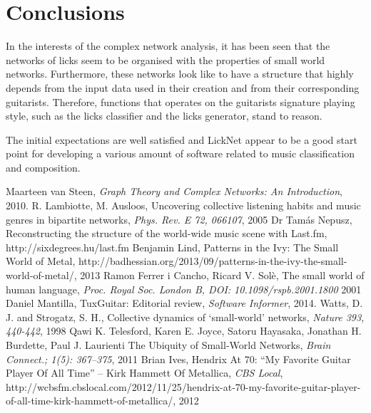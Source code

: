 \documentclass{llncs}
\begin{document}
\section{Conclusions}
In the interests of the complex network analysis, it has been seen that
the networks of licks seem to be organised with the properties of small
world networks. Furthermore, these networks look like to have a
structure that highly depends from the input data used in their
creation and from their corresponding guitarists. Therefore, functions
that operates on the guitarists signature playing style, such as the
licks classifier and the licks generator, stand to reason.

The initial expectations are well satisfied and LickNet appear to be a
good start point for developing a various amount of software related to
music classification and composition.

\begin{thebibliography}{50}
		Maarteen van Steen, 
		\textsl{Graph Theory and Complex Networks: An Introduction}, 
		2010.
		R. Lambiotte, M. Ausloos,
		Uncovering collective listening habits and music genres in bipartite networks,
		\textsl{Phys. Rev. E 72, 066107},
		2005
		Dr Tamás Nepusz,
		Reconstructing the structure of the world-wide music scene with Last.fm,
		http://sixdegrees.hu/last.fm
		Benjamin Lind,
		Patterns in the Ivy: The Small World of Metal,
		http://badhessian.org/2013/09/patterns-in-the-ivy-the-small-world-of-metal/,
		2013
		Ramon Ferrer i Cancho, Ricard V. Solè,
		The small world of human language,
		\textsl{Proc. Royal Soc. London B, DOI: 10.1098/rspb.2001.1800}
		2001
		Daniel Mantilla,
		TuxGuitar: Editorial review,
		\textsl{Software Informer},
		2014.
		Watts, D. J. and Strogatz, S. H.,
		Collective dynamics of `small-world’ networks,
		\textsl{Nature 393, 440-442},
		1998
		Qawi K. Telesford, Karen E. Joyce, Satoru Hayasaka, Jonathan H. Burdette, Paul J. Laurienti
		The Ubiquity of Small-World Networks,
		\textsl{Brain Connect.; 1(5): 367–375},
		2011
		Brian Ives,
		Hendrix At 70: “My Favorite Guitar Player Of All Time” – Kirk Hammett Of Metallica,
		\textsl{CBS Local},
		http://wcbsfm.cbslocal.com/2012/11/25/hendrix-at-70-my-favorite-guitar-player-of-all-time-kirk-hammett-of-metallica/,
		2012
	\end{thebibliography}
\end{document}
